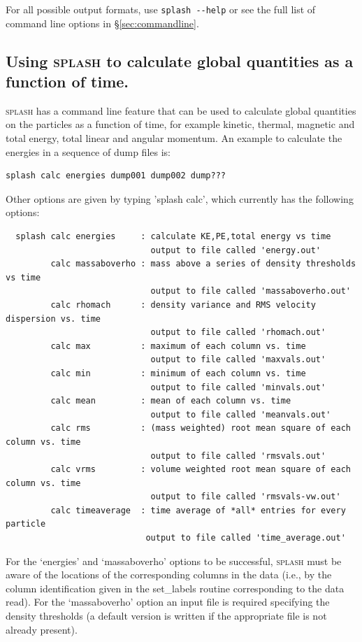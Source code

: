 \documentclass[a4paper,10pt]{article}
\newcommand{\splash}{\textsc{splash }}
\begin{document}
For all possible output formats, use \verb+splash --help+ or see the full list of command line options in \S\ref{sec:commandline}.

\subsection{Using \splash to calculate global quantities as a function of time.}
\label{sec:splashcalc}
 \splash has a command line feature that can be used to calculate global quantities on the particles as a function of time, for example kinetic, thermal, magnetic and total energy, total linear and angular momentum. An example to calculate the energies in a sequence of dump files is:
\begin{verbatim}
splash calc energies dump001 dump002 dump???
\end{verbatim}
Other options are given by typing 'splash calc', which currently has the following options:
\begin{verbatim}
  splash calc energies     : calculate KE,PE,total energy vs time
                             output to file called 'energy.out'
         calc massaboverho : mass above a series of density thresholds vs time
                             output to file called 'massaboverho.out'
         calc rhomach      : density variance and RMS velocity dispersion vs. time
                             output to file called 'rhomach.out'
         calc max          : maximum of each column vs. time
                             output to file called 'maxvals.out'
         calc min          : minimum of each column vs. time
                             output to file called 'minvals.out'
         calc mean         : mean of each column vs. time
                             output to file called 'meanvals.out'
         calc rms          : (mass weighted) root mean square of each column vs. time
                             output to file called 'rmsvals.out'
         calc vrms         : volume weighted root mean square of each column vs. time
                             output to file called 'rmsvals-vw.out'
         calc timeaverage  : time average of *all* entries for every particle
                            output to file called 'time_average.out'
\end{verbatim}
For the `energies' and `massaboverho' options to be successful, \splash must be aware of the locations of the corresponding columns in the data (i.e., by the column identification given in the set\_labels routine corresponding to the data read). For the `massaboverho' option an input file is required specifying the density thresholds (a default version is written if the appropriate file is not already present).
 
\end{document}
